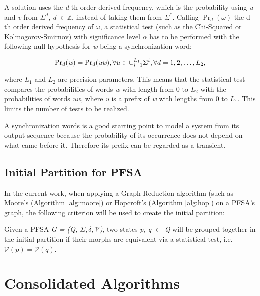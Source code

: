 {  A solution uses the \textit{d}-th order derived frequency, which is the probability using \textit{u} and \textit{v} from $\Sigma^d$, \textit{d} $\in \mathbb{Z}$, instead of taking them from $\Sigma^*$. Calling $\Pr_d(\omega)$ the d-th order derived frequency of $\omega$, a statistical test (such as the Chi-Squared or Kolmogorov-Smirnov) with significance level $\alpha$ has to be performed with the following null hypothesis for \textit{w} being a synchronization word:

\begin{equation}
\textnormal{Pr}_{d}(\textit{w}) = \textnormal{Pr}_{d}(\textit{uw}), \forall u \in \cup_{i=1}^{L_1}\Sigma^i, \forall d = 1,2,\ldots,L_2,  
\label{eq:practsynchword}
\end{equation}

where $L_1$ and $L_2$ are precision parameters. This means that the statistical test compares the probabilities of words \textit{w} with length from 0 to \textit{$L_2$} with the probabilities of words \textit{uw}, where \textit{u} is a prefix of \textit{w} with lengths from 0 to \textit{$L_1$}. This limits the number of tests to be realized.

A synchronization words is a good starting point to model a system from its output sequence because the probability of its occurrence does not depend on what came before it. Therefore its prefix can be regarded as a transient.

\subsection{Initial Partition for PFSA}\label{subsec:inipart}

In the current work, when applying a Graph Reduction algorithm (such as Moore's (Algorithm \ref{alg:moore}) or Hopcroft's (Algorithm \ref{alg:hop}) on a PFSA's graph, the following criterion will be used to create the initial partition:

\begin{definition}\label{def:inipartpfsa}

Given a PFSA \textit{G = (Q, $\Sigma, \delta, \mathcal{V}$)}, two states \textit{p, q} $\in$ \textit{Q} will be grouped together in the initial partition if their morphs are equivalent via a statistical test, i.e. $\mathcal{V}(p) = \mathcal{V}(q)$.

\end{definition}



\section{Consolidated Algorithms}

}
